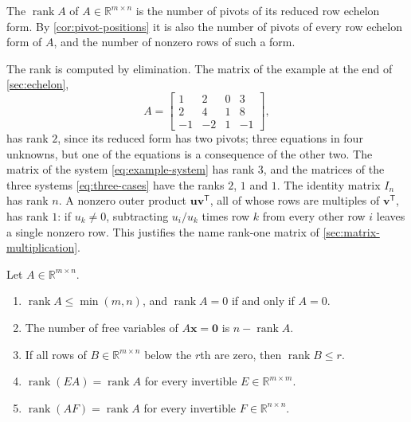 \begin{definition}[Rank]
\label{def:rank}
The  $\operatorname{rank}A$ of $A\in\mathbb R^{m\times n}$ is the number of pivots of its reduced row echelon form. By \cref{cor:pivot-positions} it is also the number of pivots of every row echelon form of $A$, and the number of nonzero rows of such a form.
\end{definition}

The rank is computed by elimination. The matrix of the example at the end of \cref{sec:echelon},
\[
A=\begin{bmatrix}1&2&0&3\\2&4&1&8\\-1&-2&1&-1\end{bmatrix},
\]
has rank $2$, since its reduced form has two pivots; three equations in four unknowns, but one of the equations is a consequence of the other two. The matrix of the system \eqref{eq:example-system} has rank $3$, and the matrices of the three systems \eqref{eq:three-cases} have the ranks $2$, $1$ and $1$. The identity matrix $I_n$ has rank $n$. A nonzero outer product $\mathbf u\mathbf v^{\mathsf T}$, all of whose rows are multiples of $\mathbf v^{\mathsf T}$, has rank $1$: if $u_k\ne0$, subtracting $u_i/u_k$ times row $k$ from every other row $i$ leaves a single nonzero row. This justifies the name rank-one matrix of \cref{sec:matrix-multiplication}.

\begin{proposition}
\label{prop:rank-basic}
Let $A\in\mathbb R^{m\times n}$.
\begin{enumerate}
\item $\operatorname{rank}A\le\min(m,n)$, and $\operatorname{rank}A=0$ if and only if $A=0$.
\item The number of free variables of $A\mathbf x=\mathbf 0$ is $n-\operatorname{rank}A$.
\item If all rows of $B\in\mathbb R^{m\times n}$ below the $r$th are zero, then $\operatorname{rank}B\le r$.
\item $\operatorname{rank}(EA)=\operatorname{rank}A$ for every invertible $E\in\mathbb R^{m\times m}$.
\item $\operatorname{rank}(AF)=\operatorname{rank}A$ for every invertible $F\in\mathbb R^{n\times n}$.
\end{enumerate}
\end{proposition}

